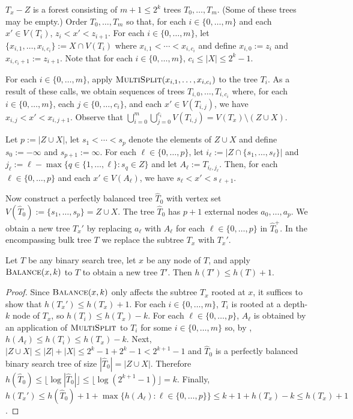 \documentclass[kpfonts]{patmorin}
\let\le\leqslant
\begin{document}
$T_x-Z$ is a forest consisting of $m+1\le 2^{k}$ trees $T_0,\ldots,T_m$. (Some of these trees may be empty.)  Order $T_{0},\ldots,T_m$ so that, for each $i\in\{0,\ldots,m\}$ and each $x'\in V(T_i)$, $z_i< x' < z_{i+1}$.  For each $i\in\{0,\ldots,m\}$, let $\{x_{i,1},\ldots,x_{i,c_i}\}:=X\cap V(T_i)$ where $x_{i,1}<\cdots<x_{i,c_i}$ and define $x_{i,0}:=z_i$ and $x_{i,c_i+1}:=z_{i+1}$. Note that for each $i\in\{0,\ldots,m\}$, $c_i\le |X|\le 2^k-1$.

For each $i\in\{0,\ldots,m\}$, apply $\textsc{MultiSplit}(x_{i,1},\ldots,x_{i,c_i})$ to the tree $T_i$.  As a result of these calls, we obtain sequences of trees $T_{i,0},\ldots,T_{i,c_i}$ where, for each $i\in\{0,\ldots,m\}$, each $j\in\{0,\ldots,c_i\}$, and each $x'\in V(T_{i,j})$, we have $x_{i,j}<x'<x_{i,j+1}$.  Observe that $\bigcup_{i=0}^m\bigcup_{j=0}^{c_i} V(T_{i,j}) = V(T_x)\setminus (Z\cup X)$.

Let $p:=|Z\cup X|$, let $s_1<\cdots< s_p$ denote the elements of $Z\cup X$ and define $s_0:=-\infty$ and $s_{p+1}:=\infty$.  For each $\ell\in\{0,\ldots,p\}$, let $i_\ell:=|Z\cap \{s_1,\ldots,s_\ell\}|$ and $j_\ell:= \ell - \max\{ q\in\{1,\ldots,\ell\}: s_q\in Z\}$ and let $A_\ell:=T_{i_\ell,j_\ell}$.   Then, for each $\ell\in \{0,\ldots,p\}$ and each $x'\in V(A_\ell)$, we have $s_\ell < x' < s_{\ell+1}$.

Now construct a perfectly balanced tree $\hat{T}_0$ with vertex set $V(\hat{T}_0):=\{s_1,\ldots,s_p\}=Z\cup X$.  The tree $\hat{T}_0$ has $p+1$ external nodes $a_0,\ldots,a_p$.  We obtain a new tree $T_x'$ by replacing $a_\ell$ with $A_\ell$ for each $\ell\in\{0,\ldots,p\}$ in $\hat{T}_0^+$.  In the encompassing bulk tree $T$ we replace the subtree $T_x$ with $T_x'$.

\begin{lem}
  Let $T$ be any binary search tree, let $x$ be any node of $T$, and apply $\textsc{Balance}(x,k)$ to $T$ to obtain a new tree $T'$.  Then $h(T')\le h(T)+1$.
\end{lem}

\begin{proof}
  Since $\textsc{Balance}(x,k)$ only affects the subtree $T_x$ rooted at $x$, it suffices to show that $h(T_x')\le h(T_x)+1$.  For each $i\in\{0,\ldots, m\}$, $T_i$ is rooted at a depth-$k$ node of $T_x$, so $h(T_i)\le h(T_x)-k$. For each $\ell \in\{0,\ldots,p\}$, $A_\ell$ is obtained by an application of $\textsc{MultiSplit}$ to $T_i$ for some $i\in\{0,\ldots,m\}$ so, by , $h(A_\ell)\le h(T_i)\le h(T_x)-k$.  Next, $|Z\cup X|\le |Z|+|X| \le 2^k-1 + 2^k-1 < 2^{k+1}-1$ and $\hat{T}_0$ is a perfectly balanced binary search tree of size $|\hat{T}_0|=|Z\cup X|$.  Therefore $h(\hat{T}_0)\le \lfloor\log|\hat{T}_0|\rfloor\le \lfloor\log(2^{k+1}-1)\rfloor = k$.  Finally, $h(T_x')\le h(\hat{T}_0)+1 +\max \{h(A_\ell):\ell\in\{0,\ldots,p\}\} \le k +1 + h(T_x) - k\le h(T_x)+1$.
\end{proof}
\end{document}
